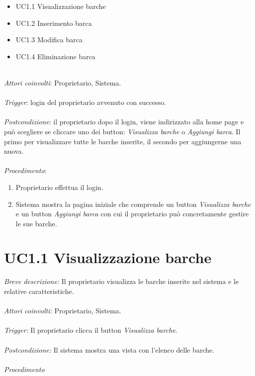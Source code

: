 \begin{itemize}
    \item UC1.1 Visualizzazione barche
    \item UC1.2 Inserimento barca
    \item UC1.3 Modifica barca
    \item UC1.4 Eliminazione barca
\end{itemize}
~\\
\emph{Attori coinvolti}: Proprietario, Sistema.\\\\
\emph{Trigger}: login del proprietario avvenuto con successo.\\\\
\emph{Postcondizione}: il proprietario dopo il login, viene indirizzato alla home page e può scegliere se cliccare uno dei button: \textit{Visualizza barche} o \textit{Aggiungi barca}. Il primo per visualizzare
tutte le barche inserite, il secondo per aggiungerne una nuova.\\\\
\emph{Procedimento}:

\begin{enumerate}
    \item Proprietario effettua il login.
    \item Sistema mostra la pagina iniziale che comprende un button \textit{Visualizza barche} e un button \textit{Aggiungi barca} con cui il proprietario può concretamente gestire le sue barche.
\end{enumerate}

\section{UC1.1 Visualizzazione barche}

\emph{Breve descrizione:} Il proprietario visualizza le barche inserite nel sistema e le relative caratteristiche.\\\\
\emph{Attori coinvolti:} Proprietario, Sistema.\\\\
\emph{Trigger:} Il proprietario clicca il button \textit{Visualizza barche}.\\\\
\emph{Postcondizione:} Il sistema mostra una vista con l'elenco delle barche.\\\\
\emph{Procedimento}

